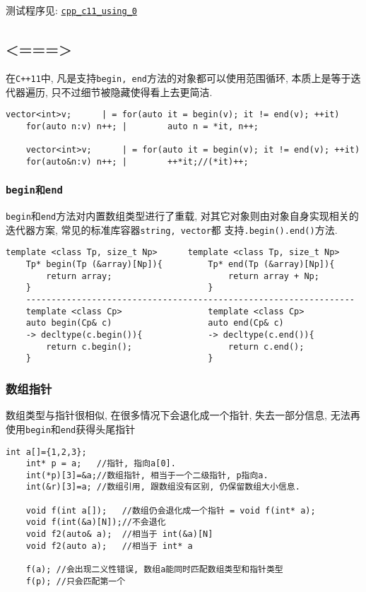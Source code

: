 测试程序见: \href{https://github.com/wenqingqian/Obtuse/tree/main/test/cpp/c++11/using_0}{\tt cpp\_c11\_using\_0}
\subsection{<===>\color{purple}{范围循环}}
在{\tt C++11}中, 凡是支持{\tt begin, end}方法的对象都可以使用范围循环, 本质上是等于迭代器遍历, 
	只不过细节被隐藏使得看上去更简洁.
\begin{lstlisting}[xleftmargin=2em,xrightmargin=2em]
	vector<int>v;      | = for(auto it = begin(v); it != end(v); ++it)
	for(auto n:v) n++; |		auto n = *it, n++;
		
	vector<int>v;      | = for(auto it = begin(v); it != end(v); ++it)
	for(auto&n:v) n++; |		++*it;//(*it)++;
\end{lstlisting}
\subsubsection{\tt{begin}和\tt{end}}
{\tt begin}和{\tt end}方法对内置数组类型进行了重载, 对其它对象则由对象自身实现相关的迭代器方案, 常见的标准库容器{\tt string, vector}都
	支持{\tt .begin().end()}方法.

\begin{lstlisting}[xleftmargin=2em,xrightmargin=2em,title=部分impl]
	template <class Tp, size_t Np>   	template <class Tp, size_t Np> 
	Tp* begin(Tp (&array)[Np]){			Tp* end(Tp (&array)[Np]){
		return array;						return array + Np;
	}									}
    -----------------------------------------------------------------
	template <class Cp>					template <class Cp>
	auto begin(Cp& c) 					auto end(Cp& c) 
	-> decltype(c.begin()){				-> decltype(c.end()){
		return c.begin();					return c.end();
	}									}
\end{lstlisting}
\subsubsection{数组指针}
数组类型与指针很相似, 在很多情况下会退化成一个指针, 失去一部分信息, 无法再使用{\tt begin}和{\tt end}获得头尾指针

\begin{lstlisting}[xleftmargin=2em,xrightmargin=2em]
	int a[]={1,2,3};
	int* p = a;   //指针, 指向a[0].
	int(*p)[3]=&a;//数组指针, 相当于一个二级指针, p指向a.
	int(&r)[3]=a; //数组引用, 跟数组没有区别, 仍保留数组大小信息.

	void f(int a[]);   //数组仍会退化成一个指针 = void f(int* a);
	void f(int(&a)[N]);//不会退化
	void f2(auto& a);  //相当于 int(&a)[N]
	void f2(auto a);   //相当于 int* a

	f(a); //会出现二义性错误, 数组a能同时匹配数组类型和指针类型
	f(p); //只会匹配第一个
\end{lstlisting}

